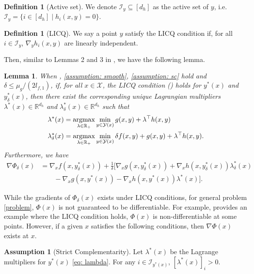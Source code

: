 \documentclass{article}
\newcommand{\Ic}{\mathcal{I}}
\newcommand{\Xc}{\mathcal{X}}
\newcommand{\Yc}{\mathcal{Y}}
\def\R{\mathbb{R}}
\newcommand{\argmax}{\mathop{\rm argmax}}
\theoremstyle{plain}
\newtheorem{lemma}[theorem]{Lemma}
\theoremstyle{definition}
\newtheorem{definition}[theorem]{Definition}
\newtheorem{assumption}[theorem]{Assumption}
\theoremstyle{remark}
\begin{document}
\begin{definition}[Active set]
    We denote $\Ic_{y}\subseteq [d_h]$ as the active set of $y$, i.e. $\Ic_{y}=\{i\in [d_h] \mid h_i(x,y)=0\}$.
\end{definition}

\begin{definition}[LICQ]\label{def: licq}
   We say a point $y$ satisfy the LICQ condition if, for all $i\in \Ic_{y}$,  $\nabla_y h_i(x,y)$ are linearly independent.
\end{definition}

Then, similar to Lemmas 2 and 3 in \cite{jiang2024primal}, we have the following lemma.
\begin{lemma}\label{lemma: nabla phi delta}
    When , \ref{assumption: smooth}, \ref{assumption: sc} hold and $\delta \leq \mu_g/(2l_{f,1})$, if, for all $x\in \Xc$, the LICQ condition () holds for $y^*(x)$ and $y^*_\delta(x)$, then there exist the corresponding unique Lagrangian multipliers $\lambda^*(x)\in \R^{d_h}$ and $\lambda^*_\delta(x)\in \R^{d_h}$ such that
    \begin{align}\label{eq: lambda}
        &\lambda^*(x)=\argmax_{\lambda \in \R_+}\min_{y \in \Yc(x)}g(x,y)+\lambda^\top h(x,y)\\ \label{eq: lambda delta}
        &\lambda^*_\delta(x)=\argmax_{\lambda \in \R_+}\min_{y \in \Yc(x)}\delta f(x,y)+g(x,y)+\lambda^\top h(x,y).
    \end{align}
    Furthermore, we have
    \begin{align*}
        \nabla \Phi_\delta(x)&=\nabla_x f(x, y^*_\delta(x))+\frac{1}{\delta}[\nabla_x g(x, y^*_\delta(x))+\nabla_x h(x, y^*_\delta(x))\lambda^*_\delta(x)\\
        &\qquad -\nabla_x g(x, y^*(x))-\nabla_x h(x, y^*(x))\lambda^*(x)].
    \end{align*}
\end{lemma}
While the gradients of $\Phi_\delta(x)$ exists under LICQ conditions, for general problem \eqref{problem}, $\Phi(x)$ is not guaranteed to be differentiable. For example, \cite{khanduri2023linearly} provides an example where the LICQ condition holds, $\Phi(x)$ is non-differentiable at some points. However, if a given $x$ satisfies the following conditions, then $\nabla \Phi(x)$ exists at $x$.
\begin{assumption}[Strict Complementarity]\label{assumption: Strict Complementarity}
    Let $\lambda^*(x)$  be the Lagrange multipliers for $y^*(x)$ \eqref{eq: lambda}. For any $i\in \Ic_{y^*(x)}$, $[\lambda^*(x)]_i > 0$.
\end{assumption}
\end{document}
